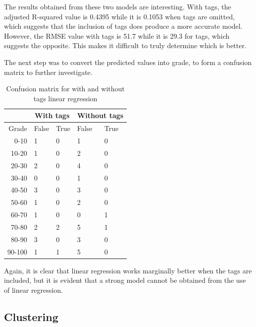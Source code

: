 \documentclass[models.tex]{subfiles}
\begin{document}
The results obtained from these two models are interesting. With tags, the
adjusted R-squared value is 0.4395 while it is 0.1053 when tags are omitted,
which suggests that the inclusion of tags does produce a more accurate model.
However, the RMSE value with tags is 51.7 while it is 29.3 for tags, which
suggests the opposite. This makes it difficult to truly determine which is
better.

The next step was to convert the predicted values into grade, to form a
confusion matrix to further investigate.

\begin{table}[H]
    \centering
    \begin{tabular}{| r | l | l | l | l |}
    \hline
    & \multicolumn{2}{c|}{\textbf{With tags}} &
    \multicolumn{2}{c|}{\textbf{Without tags}} \\
    \hline
    Grade & False & True & False & True \\
    \hline
    0-10 & 1 & 0 & 1 & 0 \\
    10-20 & 1 & 0 & 2 & 0 \\
    20-30 & 2 & 0 & 4 & 0 \\
    30-40 & 0 & 0 & 1 & 0 \\
    40-50 & 3 & 0 & 3 & 0 \\
    50-60 & 1 & 0 & 2 & 0 \\
    60-70 & 1 & 0 & 0 & 1 \\
    70-80 & 2 & 2 & 5 & 1 \\
    80-90 & 3 & 0 & 3 & 0 \\
    90-100 & 1 & 1 & 5 & 0 \\
    \hline
    \end{tabular}
    \caption{Confusion matrix for with and without tags linear regression}
\end{table}

Again, it is clear that linear regression works marginally better when the tags
are included, but it is evident that a strong model cannot be obtained from the
use of linear regression.

\subsection{Clustering} %
\label{sub:clustering}

\end{document}
